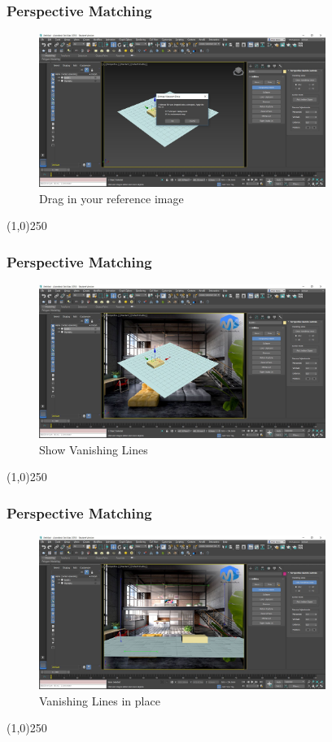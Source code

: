 \begin{frame}
	\frametitle{Perspective Matching}
	\begin{figure}
		\centering
		\includegraphics[height=5cm]{./img/PerspectiveMatching/3.jpg}
		\caption[Drag in your reference image]{Drag in your reference image}
		\label{fig:PerspectiveMatch3}
	\end{figure}
\end{frame}
\begin{center}\line(1,0){250}\end{center}


\begin{frame}
	\frametitle{Perspective Matching}
	\begin{figure}
		\centering
		\includegraphics[height=5cm]{./img/PerspectiveMatching/4.jpg}
		\caption[Show Vanishing Lines]{Show Vanishing Lines}
		\label{fig:PerspectiveMatch4}
	\end{figure}
\end{frame}
\begin{center}\line(1,0){250}\end{center}



\begin{frame}
	\frametitle{Perspective Matching}
	\begin{figure}
		\centering
		\includegraphics[height=5cm]{./img/PerspectiveMatching/6.jpg}
		\caption[Vanishing Lines in place]{Vanishing Lines in place}
		\label{fig:PerspectiveMatch6}
	\end{figure}
\end{frame}
\begin{center}\line(1,0){250}\end{center}



